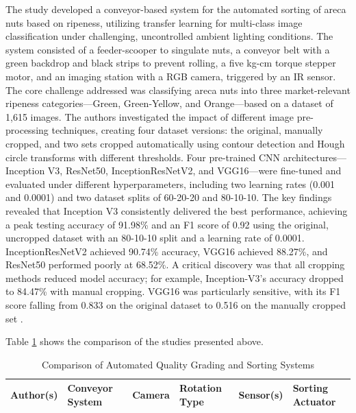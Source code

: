 {
The study developed a conveyor-based system for the automated sorting of areca nuts based on ripeness, utilizing transfer learning for multi-class image classification under challenging, uncontrolled ambient lighting conditions. The system consisted of a feeder-scooper to singulate nuts, a conveyor belt with a green backdrop and black strips to prevent rolling, a five kg-cm torque stepper motor, and an imaging station with a RGB camera, triggered by an IR sensor. The core challenge addressed was classifying areca nuts into three market-relevant ripeness categories—Green, Green-Yellow, and Orange—based on a dataset of 1,615 images. The authors investigated the impact of different image pre-processing techniques, creating four dataset versions: the original, manually cropped, and two sets cropped automatically using contour detection and Hough circle transforms with different thresholds. Four pre-trained CNN architectures—Inception V3, ResNet50, InceptionResNetV2, and VGG16—were fine-tuned and evaluated under different hyperparameters, including two learning rates (0.001 and 0.0001) and two dataset splits of 60-20-20 and 80-10-10. The key findings revealed that Inception V3 consistently delivered the best performance, achieving a peak testing accuracy of 91.98\% and an F1 score of 0.92 using the original, uncropped dataset with an 80-10-10 split and a learning rate of 0.0001. InceptionResNetV2 achieved 90.74\% accuracy, VGG16 achieved 88.27\%, and ResNet50 performed poorly at 68.52\%. A critical discovery was that all cropping methods reduced model accuracy; for example, Inception-V3’s accuracy dropped to 84.47\% with manual cropping. VGG16 was particularly sensitive, with its F1 score falling from 0.833 on the original dataset to 0.516 on the manually cropped set \citep{kumar2024transfer}.

Table \ref{tab:relatedstudies_one} shows the comparison of the studies presented above.

\newpage

\begin{table}
	\centering
	\caption{Comparison of Automated Quality Grading and Sorting Systems}
	\label{tab:relatedstudies_one}
	\begin{tabular}{
			>{\centering\arraybackslash}m{2cm} 
			>{\centering\arraybackslash}m{3cm}   
			>{\centering\arraybackslash}m{1.5cm} 
			>{\centering\arraybackslash}m{3cm}    
			>{\centering\arraybackslash}m{3cm}  
			>{\centering\arraybackslash}m{4cm}  
		}
		\toprule
		\textbf{Author(s)} & \textbf{Conveyor System} & \textbf{Camera} & \textbf{Rotation Type} & \textbf{Sensor(s)} & \textbf{Sorting Actuator} \\
		\midrule
		

\end{tabular}
\end{table}}
